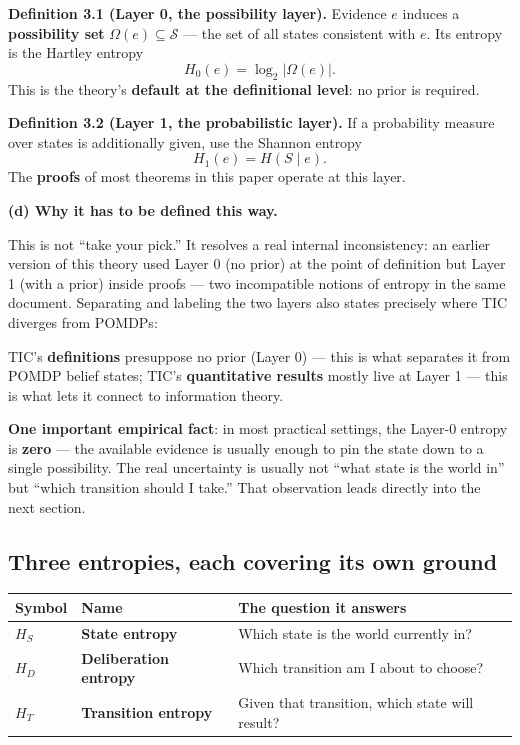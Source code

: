 \documentclass[11pt]{article}
\renewenvironment{quote}
  {\def\FrameCommand{{\color{gray!60}\vrule width 2pt}\hspace{8pt}}%
   \MakeFramed{\advance\hsize-\width \FrameRestore}\begin{itshape}}
  {\end{itshape}\endMakeFramed}
\begin{document}
\begin{quote}
\textbf{Definition 3.1 (Layer 0, the possibility layer).} Evidence \(e\) induces a \textbf{possibility set} \(\Omega(e)\subseteq\mathcal S\) --- the set of all states consistent with \(e\). Its entropy is the Hartley entropy
\[H_0(e)=\log_2|\Omega(e)|.\]
This is the theory's \textbf{default at the definitional level}: no prior is required.
\end{quote}

\begin{quote}
\textbf{Definition 3.2 (Layer 1, the probabilistic layer).} If a probability measure over states is additionally given, use the Shannon entropy
\[H_1(e)=H(S\mid e).\]
The \textbf{proofs} of most theorems in this paper operate at this layer.
\end{quote}

\textbf{(d) Why it has to be defined this way.}

This is not ``take your pick.'' It resolves a real internal inconsistency: an earlier version of this theory used Layer 0 (no prior) at the point of definition but Layer 1 (with a prior) inside proofs --- two incompatible notions of entropy in the same document. Separating and labeling the two layers also states precisely where TIC diverges from POMDPs:

\begin{quote}
TIC's \textbf{definitions} presuppose no prior (Layer 0) --- this is what separates it from POMDP belief states; TIC's \textbf{quantitative results} mostly live at Layer 1 --- this is what lets it connect to information theory.
\end{quote}

\textbf{One important empirical fact}: in most practical settings, the Layer-0 entropy is \textbf{zero} --- the available evidence is usually enough to pin the state down to a single possibility. The real uncertainty is usually not ``what state is the world in'' but ``which transition should I take.'' That observation leads directly into the next section.

\hypertarget{three-entropies-each-covering-its-own-ground}{%
\subsection{Three entropies, each covering its own ground}\label{three-entropies-each-covering-its-own-ground}}

\begin{longtable}[]{@{}lll@{}}
\toprule
Symbol & Name & The question it answers\tabularnewline
\midrule
\endhead
\(H_S\) & \textbf{State entropy} & Which state is the world currently in?\tabularnewline
\(H_D\) & \textbf{Deliberation entropy} & Which transition am I about to choose?\tabularnewline
\(H_T\) & \textbf{Transition entropy} & Given that transition, which state will result?\tabularnewline
\bottomrule
\end{longtable}
\end{document}
